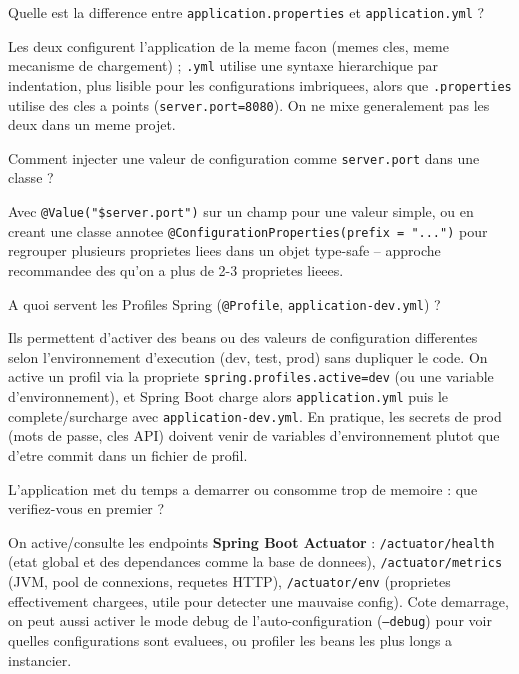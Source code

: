 \documentclass[11pt,a4paper]{article}
\begin{document}
\begin{question} Quelle est la difference entre \texttt{application.properties} et \texttt{application.yml} ?
\end{question}
\begin{reponse}
Les deux configurent l'application de la meme facon (memes cles, meme mecanisme de chargement) ; \texttt{.yml} utilise une syntaxe hierarchique par indentation, plus lisible pour les configurations imbriquees, alors que \texttt{.properties} utilise des cles a points (\texttt{server.port=8080}). On ne mixe generalement pas les deux dans un meme projet.
\end{reponse}

\begin{question} Comment injecter une valeur de configuration comme \texttt{server.port} dans une classe ?
\end{question}
\begin{reponse}
Avec \texttt{@Value("\${server.port}")} sur un champ pour une valeur simple, ou en creant une classe annotee \texttt{@ConfigurationProperties(prefix = "...")} pour regrouper plusieurs proprietes liees dans un objet type-safe -- approche recommandee des qu'on a plus de 2-3 proprietes lieees.
\end{reponse}

\begin{question} A quoi servent les Profiles Spring (\texttt{@Profile}, \texttt{application-dev.yml}) ?
\end{question}
\begin{reponse}
Ils permettent d'activer des beans ou des valeurs de configuration differentes selon l'environnement d'execution (dev, test, prod) sans dupliquer le code. On active un profil via la propriete \texttt{spring.profiles.active=dev} (ou une variable d'environnement), et Spring Boot charge alors \texttt{application.yml} puis le complete/surcharge avec \texttt{application-dev.yml}. En pratique, les secrets de prod (mots de passe, cles API) doivent venir de variables d'environnement plutot que d'etre commit dans un fichier de profil.
\end{reponse}

\begin{question} L'application met du temps a demarrer ou consomme trop de memoire : que verifiez-vous en premier ?
\end{question}
\begin{reponse}
On active/consulte les endpoints \textbf{Spring Boot Actuator} : \texttt{/actuator/health} (etat global et des dependances comme la base de donnees), \texttt{/actuator/metrics} (JVM, pool de connexions, requetes HTTP), \texttt{/actuator/env} (proprietes effectivement chargees, utile pour detecter une mauvaise config). Cote demarrage, on peut aussi activer le mode debug de l'auto-configuration (\texttt{--debug}) pour voir quelles configurations sont evaluees, ou profiler les beans les plus longs a instancier.
\end{reponse}
\end{document}
